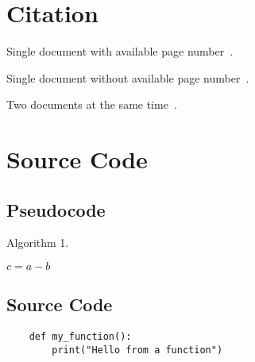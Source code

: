 \section{Citation}

Single document with available page number~.

Single document without available page number~.

Two documents at the same time~.

\section{Source Code}

\subsection{Pseudocode}
\begin{algorithm}
\caption{Algorithm 1.}
\label{alg:alg-1}
     {
        $c = a - b$ \;
    }
\end{algorithm}

\subsection{Source Code}

\begin{verbatim}
    def my_function():
        print("Hello from a function")
\end{verbatim}